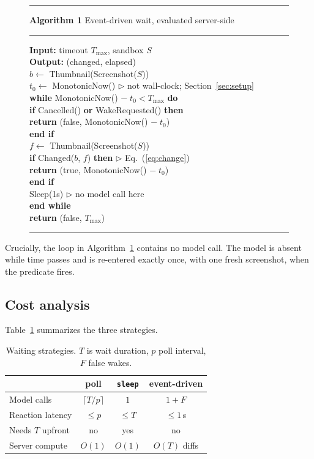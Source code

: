 \documentclass[conference]{IEEEtran}
\begin{document}
\newcommand{\algline}[2]{\makebox[1.8em][r]{\footnotesize #1:}\hspace{0.4em}#2\\}
\newcommand{\algind}{\hspace*{1.2em}}
\begin{figure}[t]
\hrule\vspace{2pt}
\textbf{Algorithm 1} Event-driven wait, evaluated server-side
\vspace{2pt}\hrule\vspace{4pt}
{\footnotesize\ttfamily\raggedright
\algline{}{\textbf{Input:} timeout $T_{\max}$, sandbox $S$}
\algline{}{\textbf{Output:} (changed, elapsed)}
\algline{1}{$b \leftarrow$ Thumbnail(Screenshot($S$))}
\algline{2}{$t_0 \leftarrow$ MonotonicNow() \hfill $\triangleright$ not wall-clock; Section~\ref{sec:setup}}
\algline{3}{\textbf{while} MonotonicNow() $- \; t_0 < T_{\max}$ \textbf{do}}
\algline{4}{\algind \textbf{if} Cancelled() \textbf{or} WakeRequested() \textbf{then}}
\algline{5}{\algind\algind \textbf{return} (false, MonotonicNow() $-\; t_0$)}
\algline{6}{\algind \textbf{end if}}
\algline{7}{\algind $f \leftarrow$ Thumbnail(Screenshot($S$))}
\algline{8}{\algind \textbf{if} Changed($b$, $f$) \textbf{then} \hfill $\triangleright$ Eq.~(\ref{eq:change})}
\algline{9}{\algind\algind \textbf{return} (true, MonotonicNow() $-\; t_0$)}
\algline{10}{\algind \textbf{end if}}
\algline{11}{\algind Sleep(1s) \hfill $\triangleright$ no model call here}
\algline{12}{\textbf{end while}}
\algline{13}{\textbf{return} (false, $T_{\max}$)}
}
\vspace{2pt}\hrule
\label{alg:wait}
\end{figure}

Crucially, the loop in Algorithm~\ref{alg:wait} contains no model call. The model
is absent while time passes and is re-entered exactly once, with one fresh
screenshot, when the predicate fires.

\subsection{Cost analysis}
\label{sec:cost}
Table~\ref{tab:strategies} summarizes the three strategies.

\begin{table}[t]
\caption{Waiting strategies. $T$ is wait duration, $p$ poll interval,
$F$ false wakes.}
\label{tab:strategies}
\centering
\small
\begin{tabular}{@{}lccc@{}}
\toprule
 & \textbf{poll} & \textbf{\texttt{sleep}} & \textbf{event-driven} \\
\midrule
Model calls        & $\lceil T/p \rceil$ & $1$        & $1 + F$ \\
Reaction latency   & $\leq p$            & $\leq T$   & $\leq 1$\,s \\
Needs $T$ upfront  & no                  & yes        & no \\
Server compute     & $O(1)$              & $O(1)$     & $O(T)$ diffs \\
\bottomrule
\end{tabular}
\end{table}
\end{document}
